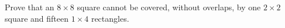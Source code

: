 Prove that an $8\times8$ square cannot be covered, without overlaps, by one $2\times2$ square and fifteen $1\times4$ rectangles.
